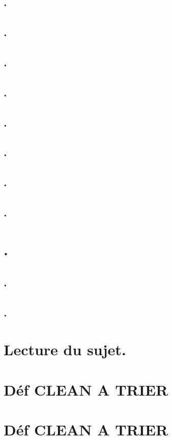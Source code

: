 \documentclass[12pt,a4paper]{article}
\begin{document}
\subsection{.}
\subsection{.}
\subsection{.}
\subsection{.}
\subsection{.}
\subsection{.}
\subsection{.}
\subsection{.}
\section{.}
\subsection{.}
\subsection{.}






\section{Lecture du sujet.}
\section{Déf CLEAN A TRIER }
\section{Déf CLEAN A TRIER }
\end{document}
